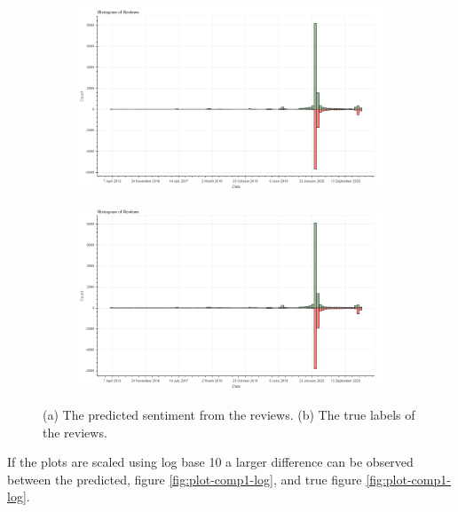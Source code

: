 \begin{figure}[H]
    \centering
    \begin{subfigure}[b]{0.9\textwidth}
        \includegraphics[width=1\textwidth]{../plots/validation_plot.png}
       \caption{}
       \label{fig:plot-comp1} 
    \end{subfigure}
    
    \begin{subfigure}[b]{0.9\textwidth}
        \includegraphics[width=1\textwidth]{../plots/true_plot.png}
       \caption{}
       \label{fig:plot-comp2}
    \end{subfigure}
    
    \caption[Plot of Reviews]{(a) The predicted sentiment from the reviews. (b) The true labels of the reviews.}
\end{figure}


If the plots are scaled using log base 10 a larger difference can be observed between the predicted, figure \ref{fig:plot-comp1-log}, and true figure \ref{fig:plot-comp1-log}. 


